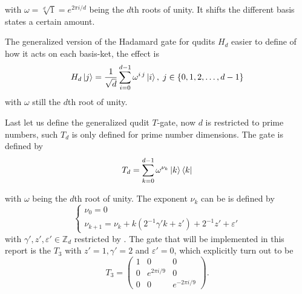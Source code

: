 with $\omega = \sqrt[d]{1} = e^{2\pi i/d}$ being the $d$th roots of unity. It shifts the different basis states a certain amount.

The generalized version of the Hadamard gate for qudits $H_d$ easier to define of how it acts on each basis-ket, the effect is 
\begin{equation}
H_d\ket{j} = \dfrac{1}{\sqrt{d}}\sum_{i=0}^{d-1} \omega^{i\,j}\ket{i},\; j\in \{0,1,2, \dots, d-1\}
\end{equation}
with $\omega$ still the $d$th root of unity.

Last let us define the generalized qudit $T$-gate, now $d$ is restricted to prime numbers, such $T_d$ is only defined for prime number dimensions. 
The gate is defined by
\begin{equation}
T_d = \sum_{k=0}^{d-1} \omega^{\nu_k}\ket{k}\bra{k}
\end{equation}

with $\omega$ being the $d$th root of unity. The exponent $\nu_k$ can be is defined by
\begin{equation}
\begin{cases}
\nu_0 = 0\\
\nu_{k+1} = \nu_k + k(2^{-1}\gamma'k + z') + 2^{-1}z' + \varepsilon'
\end{cases}
\end{equation} 
with $\gamma',z',\varepsilon' \in \mathbb{Z}_d$ restricted by .
The gate that will be implemented in this report is the $T_3$ with $z' = 1, \gamma' = 2$ and $\varepsilon' = 0$, which explicitly turn out to be 
\begin{equation}
T_3 = \begin{pmatrix}
1 & 0 & 0\\
0 & e^{2\pi i/9}& 0 \\
0 & 0 & e^{-2\pi i /9}
\end{pmatrix}.
\end{equation}




